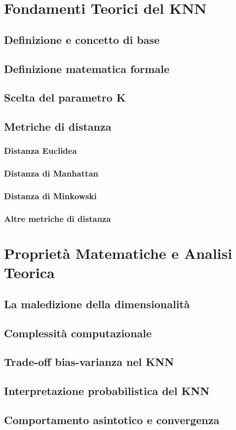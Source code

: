 \section{Fondamenti Teorici del KNN}
\subsection{Definizione e concetto di base}
\subsection{Definizione matematica formale}
\subsection{Scelta del parametro K}
\subsection{Metriche di distanza}
\subsubsection{Distanza Euclidea}
\subsubsection{Distanza di Manhattan}
\subsubsection{Distanza di Minkowski}
\subsubsection{Altre metriche di distanza}

\section{Proprietà Matematiche e Analisi Teorica}
\subsection{La maledizione della dimensionalità}
\subsection{Complessità computazionale}
\subsection{Trade-off bias-varianza nel KNN}
\subsection{Interpretazione probabilistica del KNN}
\subsection{Comportamento asintotico e convergenza}